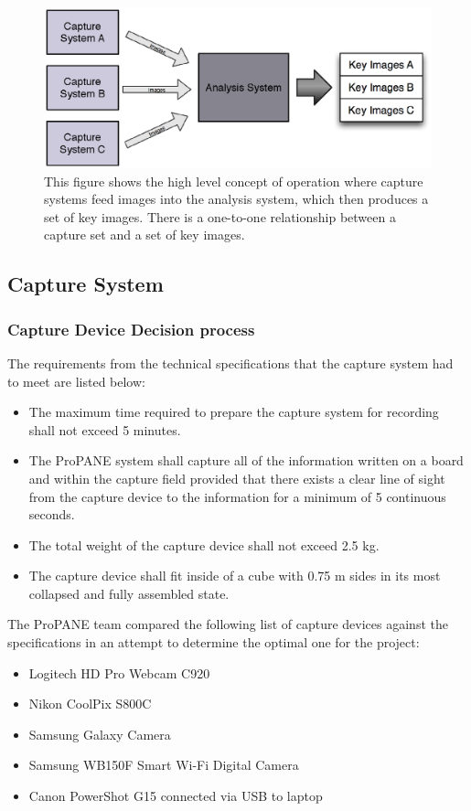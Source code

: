\documentclass[]{article}
\begin{document}
			\begin{figure}[h]
				\centering
				\includegraphics[scale=0.8]{images/concept-of-operation.eps}
				\caption{This figure shows the high level concept of operation where capture systems feed images into the analysis system, which then produces a set of key images. There is a one-to-one relationship between a capture set and a set of key images.}		
				\label{img:concept-of-operation}
			\end{figure}
			
		\subsection{Capture System}
		
			\subsubsection{Capture Device Decision process}
				The requirements from the technical specifications that the capture system had to meet are listed below:
				\begin{itemize}
					\item The maximum time required to prepare the capture system for recording shall not exceed 5 minutes.
					\item The ProPANE system shall capture all of the information written on a board and within the capture field provided that there exists a clear line of sight from the capture device to the information for a minimum of 5 continuous seconds.
					\item The total weight of the capture device shall not exceed 2.5 kg.
					\item The capture device shall fit inside of a cube with 0.75 m sides in its most collapsed and fully assembled state. 
				\end{itemize}
				
				\noindent
				The ProPANE team compared the following list of capture devices against the specifications in an attempt to determine the optimal one for the project:
				\begin{itemize}
					\item Logitech HD Pro Webcam C920
					\item Nikon CoolPix S800C
					\item Samsung Galaxy Camera
					\item Samsung WB150F Smart Wi-Fi Digital Camera
					\item Canon PowerShot G15 connected via USB to laptop
				\end{itemize}
				
\end{document}
